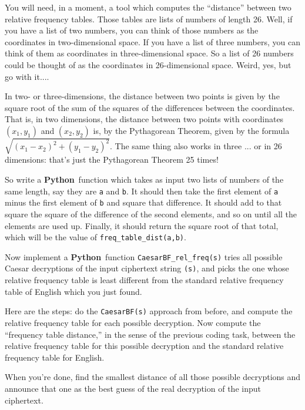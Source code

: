 \documentclass[12pt,letterpaper]{amsbook}
\theoremstyle{definition}
\theoremstyle{remark}
\numberwithin{figure}{section}
\numberwithin{exercise}{chapter}
\numberwithin{section}{chapter}
\numberwithin{equation}{section}
\numberwithin{table}{subsection}
\newcommand{\code}[1]{\colorbox{lg}{\texttt{#1}}}
\newcommand{\Python}{{\textbf{\ix{Python}}}}
\newcommand{\ix}[1]{{#1}\index{#1}}
\begin{document}
\vskip2mm
\begin{CTtcb}[label=ct:dist_rel_freq_tables]{}{}
  You will need, in a moment, a tool which computes the ``distance'' between
  two relative frequency tables.  Those tables are lists of numbers of length
  26.  Well, if you have a list of two numbers, you can think of those numbers
  as the coordinates in two-dimensional space.  If you have a list of three
  numbers, you can think of them as coordinates in three-dimensional space.
  So a list of 26 numbers could be thought of as the coordinates in
  26-dimensional space.   Weird, yes, but go with it....

  In two- or three-dimensions, the distance between two points is given by the
  square root of the sum of the squares of the differences between the
  coordinates.  That is, in two dimensions, the distance between two points
  with coordinates $(x_1,y_1)$ and $(x_2,y_2)$ is, by the
  \ix{Pythagorean Theorem}, given by the formula
  $\sqrt{(x_1-x_2)^2+(y_1-y_2)^2}$.  The same thing also works in three ... or
  in 26 dimensions: that's just the Pythagorean Theorem 25 times!

  So write a \Python\ function which takes as input two lists of numbers of
  the same length, say  they are \code{a} and \code{b}.   It should
  then take the first element of \code{a} minus the first element of
  \code{b} and square that difference.  It should add to that square the
  square of the difference of the second elements, and so on until all the
  elements are used up.  Finally, it should return the square root of that
  total, which will be the value of \code{freq\_table\_dist(a,b)}.
\end{CTtcb}

\vskip2mm
\begin{CTtcb}[label=ct:CaesarBF_rel_freqs]{}{}
  Now implement a \Python\ function \code{CaesarBF\_rel\_freq(s)} tries all
  possible Caesar decryptions of the input ciphertext string \code{(s)},
  and picks the one whose relative frequency table is least different from
  the standard relative frequency table of English which you just found.

  Here are the steps: do the \code{CaesarBF(s)} approach from before, and
  compute the relative frequency table for each possible decryption.  Now
  compute the ``frequency table distance,'' in the sense of the previous
  coding task, between the relative frequency table for this possible
  decryption and the standard relative frequency table for English.

  When you're done, find the smallest distance of all those possible decryptions
  and announce that one as the best guess of the real decryption of the input
  ciphertext.
\end{CTtcb}
\end{document}
